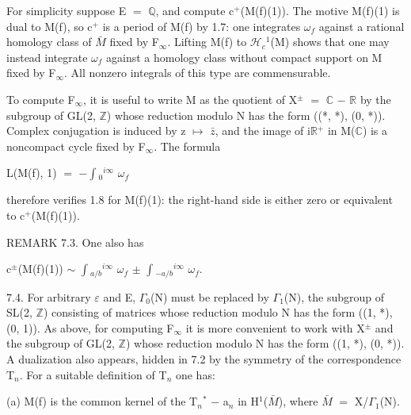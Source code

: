 \documentclass[10pt,twoside]{article}
\begin{document}
For simplicity suppose E \ensuremath{=} \ensuremath{ℚ}, and compute c\ensuremath{^{+}}(M(f)(1)). The motive M(f)(1) is dual to M(f), so c\ensuremath{^{+}} is a period of M(f) by 1.7: one integrates \ensuremath{ω}\ensuremath{_{f}} against a rational homology class of \ensuremath{\bar{M}} fixed by F\ensuremath{_{∞}}. Lifting M(f) to \ensuremath{ℋ}\ensuremath{_{c}}\ensuremath{^{1}}(M) shows that one may instead integrate \ensuremath{ω}\ensuremath{_{f}} against a homology class without compact support on M fixed by F\ensuremath{_{∞}}. All nonzero integrals of this type are commensurable.\par
To compute F\ensuremath{_{∞}}, it is useful to write M as the quotient of X\ensuremath{^{±}} \ensuremath{=} \ensuremath{ℂ} \ensuremath{−} \ensuremath{ℝ} by the subgroup of GL(2, \ensuremath{ℤ}) whose reduction modulo N has the form ((*, *), (0, *)). Complex conjugation is induced by z \ensuremath{↦} \ensuremath{\bar{z}}, and the image of i\ensuremath{ℝ}\ensuremath{^{+}} in M(\ensuremath{ℂ}) is a noncompact cycle fixed by F\ensuremath{_{∞}}. The formula\par
L(M(f), 1) \ensuremath{=} \ensuremath{−}\ensuremath{∫}\ensuremath{_{0}}\ensuremath{^{i∞}} \ensuremath{ω}\ensuremath{_{f}}\par
therefore verifies 1.8 for M(f)(1): the right-hand side is either zero or equivalent to c\ensuremath{^{+}}(M(f)(1)).\par
REMARK 7.3. One also has\par
c\ensuremath{^{±}}(M(f)(1)) \ensuremath{∼} \ensuremath{∫}\ensuremath{_{a/b}}\ensuremath{^{i∞}} \ensuremath{ω}\ensuremath{_{f}} \ensuremath{±} \ensuremath{∫}\ensuremath{_{−a/b}}\ensuremath{^{i∞}} \ensuremath{ω}\ensuremath{_{f}}.\par
7.4. For arbitrary \ensuremath{ε} and E, \ensuremath{Γ}\ensuremath{_{0}}(N) must be replaced by \ensuremath{Γ}\ensuremath{_{1}}(N), the subgroup of SL(2, \ensuremath{ℤ}) consisting of matrices whose reduction modulo N has the form ((1, *), (0, 1)). As above, for computing F\ensuremath{_{∞}} it is more convenient to work with X\ensuremath{^{±}} and the subgroup of GL(2, \ensuremath{ℤ}) whose reduction modulo N has the form ((1, *), (0, *)). A dualization also appears, hidden in 7.2 by the symmetry of the correspondence T\ensuremath{_{n}}. For a suitable definition of T\ensuremath{_{n}} one has:\par
(a) M(f) is the common kernel of the T\ensuremath{_{n}}\ensuremath{^{*}} \ensuremath{−} a\ensuremath{_{n}} in H\ensuremath{^{1}}(\ensuremath{\bar{M}}), where \ensuremath{\bar{M}} \ensuremath{=} X/\ensuremath{Γ}\ensuremath{_{1}}(N).\par
\end{document}
